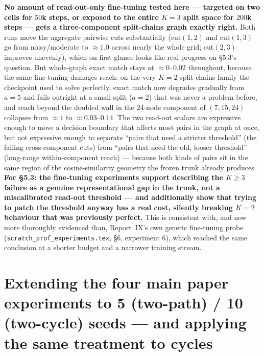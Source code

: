 \documentclass[11pt,a4paper]{article}
\begin{document}
\textbf{No amount of read-out-only fine-tuning tested here --- targeted on two cells for
$50$k steps, or exposed to the entire $K{=}3$ split space for $200$k steps --- gets a
three-component split-chains graph exactly right.} Both runs move the aggregate pairwise cuts
substantially (cut$(1,2)$ and cut$(1,3)$ go from noisy/moderate to $\approx1.0$ across nearly
the whole grid; cut$(2,3)$ improves unevenly), which on first glance looks like real progress
on \S5.3's question. But whole-graph exact match stays at $\approx0$--$0.02$ throughout,
because the same fine-tuning damages reach: on the very $K{=}2$ split-chains family the
checkpoint used to solve perfectly, exact match now degrades gradually from $a{=}5$ and fails
outright at a small split ($a{=}2$) that was never a problem before, and reach beyond the
doubled wall in the 24-node component of $(7,15,24)$ collapses from $\approx1$ to
$\approx0.03$--$0.14$. The two read-out scalars are expressive enough to move a decision
boundary that affects most pairs in the graph at once, but not expressive enough to separate
``pairs that need a stricter threshold'' (the failing cross-component cuts) from ``pairs that
need the old, looser threshold'' (long-range within-component reach) --- because both kinds of
pairs sit in the same region of the cosine-similarity geometry the frozen trunk already
produces. \textbf{For \S5.3: the fine-tuning experiments support describing the $K{\ge}3$
failure as a genuine representational gap in the trunk, not a miscalibrated read-out threshold
--- and additionally show that trying to patch the threshold anyway has a real cost, silently
breaking $K{=}2$ behaviour that was previously perfect.} This is consistent with, and now more
thoroughly evidenced than, Report~IX's own generic fine-tuning probe
(\texttt{scratch\_prof\_experiments.tex}, \S6, experiment 6), which reached the same
conclusion at a shorter budget and a narrower training stream.

\section{Extending the four main paper experiments to 5 (two-path) / 10 (two-cycle) seeds ---
and applying the same treatment to cycles}
\label{sec:fiveseed}

\begin{center}
\end{center}
\end{document}
